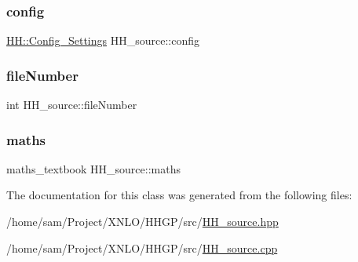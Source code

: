 \subsubsection{\texorpdfstring{config}{config}}
{\footnotesize\ttfamily \hyperlink{class_h_h_1_1_config___settings}{H\+H\+::\+Config\+\_\+\+Settings} H\+H\+\_\+source\+::config\hspace{0.3cm}{\ttfamily [private]}}

\mbox{\label{class_h_h__source_a6631481cc1bea05ab564cb1841644a12}} 
\subsubsection{\texorpdfstring{file\+Number}{fileNumber}}
{\footnotesize\ttfamily int H\+H\+\_\+source\+::file\+Number\hspace{0.3cm}{\ttfamily [private]}}

\mbox{\label{class_h_h__source_a93637ad30af846dd04eb741437114f8f}} 
\subsubsection{\texorpdfstring{maths}{maths}}
{\footnotesize\ttfamily maths\+\_\+textbook H\+H\+\_\+source\+::maths\hspace{0.3cm}{\ttfamily [private]}}



The documentation for this class was generated from the following files\+:\begin{DoxyCompactItemize}
\item 
/home/sam/\+Project/\+X\+N\+L\+O/\+H\+H\+G\+P/src/\hyperlink{_h_h__source_8hpp}{H\+H\+\_\+source.\+hpp}\item 
/home/sam/\+Project/\+X\+N\+L\+O/\+H\+H\+G\+P/src/\hyperlink{_h_h__source_8cpp}{H\+H\+\_\+source.\+cpp}\end{DoxyCompactItemize}
